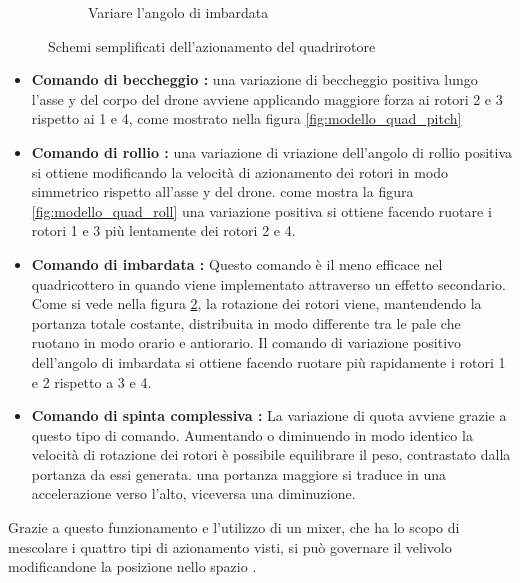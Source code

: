 \begin{figure}
\begin{subfigure}{0.45\textwidth}
		\caption{Variare l'angolo di imbardata}
		\label{fig:modello_quad_yaw}
	\end{subfigure}
	\caption{Schemi semplificati dell'azionamento del quadrirotore}
\end{figure}
\begin{itemize}
	\item \textbf{Comando di beccheggio : } una variazione di beccheggio positiva lungo l'asse y del corpo del drone avviene applicando maggiore forza ai rotori 2 e 3 rispetto ai 1 e 4, come mostrato nella figura \ref{fig:modello_quad_pitch}
	\item \textbf{Comando di rollio : } una variazione di vriazione dell'angolo di rollio positiva si ottiene modificando la velocità di azionamento dei rotori in modo simmetrico rispetto all'asse y del drone. come mostra la figura \ref{fig:modello_quad_roll} una variazione positiva si ottiene facendo ruotare i rotori 1 e 3 più lentamente dei rotori 2 e 4.
	\item \textbf{Comando di imbardata : } Questo comando è il meno efficace nel quadricottero in quando viene implementato attraverso un effetto secondario. Come si vede nella figura \ref{fig:modello_quad_yaw}, la rotazione dei rotori viene, mantendendo la portanza totale costante, distribuita in modo differente tra le pale che ruotano in modo orario e antiorario. Il comando di variazione positivo dell'angolo di imbardata si ottiene facendo ruotare più rapidamente i rotori 1 e 2 rispetto a 3 e 4.
	\item \textbf{Comando di spinta complessiva : } La variazione di quota avviene grazie a questo tipo di comando. Aumentando o diminuendo in modo identico la velocità di rotazione dei rotori è possibile equilibrare il peso, contrastato dalla portanza da essi generata. una portanza maggiore si traduce in una accelerazione verso l'alto, viceversa una diminuzione.
\end{itemize}
Grazie a questo funzionamento e l'utilizzo di un mixer, che ha lo scopo di mescolare i quattro tipi di azionamento visti, si può governare il velivolo modificandone la posizione nello spazio \cite{DesTestCarm}.
